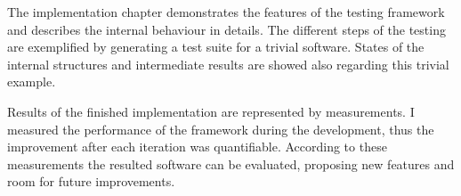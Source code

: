 The implementation chapter demonstrates the features of the testing framework and describes the internal behaviour in details. The different steps of the testing are exemplified by generating a test suite for a trivial software. States of the internal structures and intermediate results are showed also regarding this trivial example.

Results of the finished implementation are represented by measurements. I measured the performance of the framework during the development, thus the improvement after each iteration was quantifiable. According to these measurements the resulted software can be evaluated, proposing new features and room for future improvements.

\vfill
\dolgozatnyelve
{}

\setcounter{romanPage}{\value{page}}

